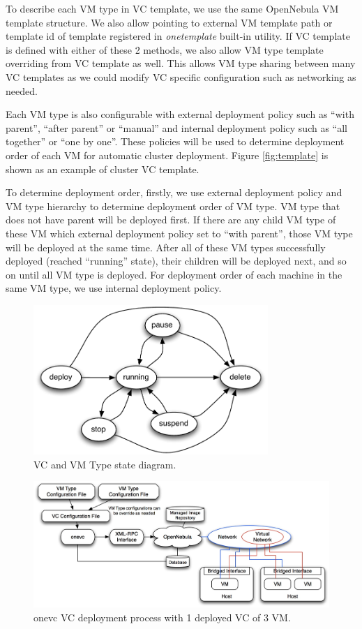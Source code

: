 \documentclass[conference]{IEEEtran}
\begin{document}
To describe each VM type in VC template, we use the same OpenNebula VM template structure.
We also allow pointing to external VM template path or template id of template registered in \emph{onetemplate} built-in utility.
If VC template is defined with either of these 2 methods, we also allow VM type template overriding from VC template as well.
This allows VM type sharing between many VC templates as we could modify VC specific configuration such as networking as needed.

Each VM type is also configurable with external deployment policy such as ``with parent'', ``after parent'' or ``manual'' and internal deployment policy such as ``all together'' or ``one by one''.
These policies will be used to determine deployment order of each VM for automatic cluster deployment.
Figure \ref{fig:template} is shown as an example of cluster VC template.

To determine deployment order, firstly, we use external deployment policy and VM type hierarchy to determine deployment order of VM type.
VM type that does not have parent will be deployed first.
If there are any child VM type of these VM which external deployment policy set to ``with parent'', those VM type will be deployed at the same time.
After all of these VM types successfully deployed (reached ``running'' state), their children will be deployed next, and so on until all VM type is deployed.
For deployment order of each machine in the same VM type, we use internal deployment policy.

\begin{figure}[!t]
\centering
\includegraphics[width=3.5in]{state}
\caption{VC and VM Type state diagram.}
\label{fig:state}
\end{figure}

\begin{figure}[!t]
\centering
\includegraphics[width=6.5in]{onevc}
\caption{onevc VC deployment process with 1 deployed VC of 3 VM.}
\label{fig:onevc}
\end{figure}
\end{document}
